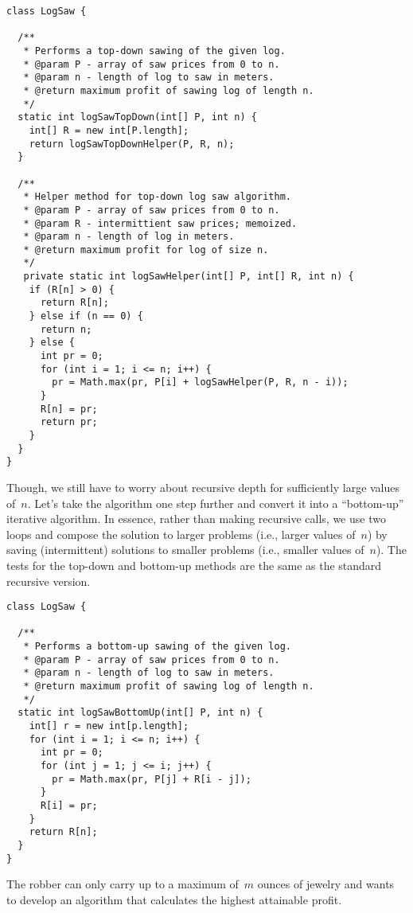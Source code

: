 \begin{lstlisting}[language=MyJava]
class LogSaw {

  /**
   * Performs a top-down sawing of the given log.
   * @param P - array of saw prices from 0 to n.
   * @param n - length of log to saw in meters.
   * @return maximum profit of sawing log of length n.
   */
  static int logSawTopDown(int[] P, int n) {
    int[] R = new int[P.length];
    return logSawTopDownHelper(P, R, n);
  }

  /**
   * Helper method for top-down log saw algorithm.
   * @param P - array of saw prices from 0 to n.
   * @param R - intermittient saw prices; memoized.
   * @param n - length of log in meters.
   * @return maximum profit for log of size n.
   */
   private static int logSawHelper(int[] P, int[] R, int n) {
    if (R[n] > 0) {
      return R[n];
    } else if (n == 0) {
      return n;
    } else {
      int pr = 0;
      for (int i = 1; i <= n; i++) {
        pr = Math.max(pr, P[i] + logSawHelper(P, R, n - i));
      }
      R[n] = pr;
      return pr;
    }
  }
}
\end{lstlisting}

Though, we still have to worry about recursive depth for sufficiently large values of~$n$. 
Let's take the algorithm one step further and convert it into a ``bottom-up'' iterative algorithm.
In essence, rather than making recursive calls, we use two loops and compose the solution to larger problems (i.e., larger values of~$n$) by saving (intermittent) solutions to smaller problems (i.e., smaller values of~$n$).
The tests for the top-down and bottom-up methods are the same as the standard recursive version.

\enlargethispage{-1\baselineskip}
\begin{lstlisting}[language=MyJava]
class LogSaw {

  /**
   * Performs a bottom-up sawing of the given log.
   * @param P - array of saw prices from 0 to n.
   * @param n - length of log to saw in meters.
   * @return maximum profit of sawing log of length n.
   */
  static int logSawBottomUp(int[] P, int n) {
    int[] r = new int[p.length];
    for (int i = 1; i <= n; i++) {
      int pr = 0;
      for (int j = 1; j <= i; j++) {
        pr = Math.max(pr, P[j] + R[i - j]);
      }
      R[i] = pr;
    }
    return R[n];
  }
}
\end{lstlisting}

The robber can only carry up to a maximum of~$m$ ounces of jewelry and wants to develop an algorithm that calculates the highest attainable profit.


